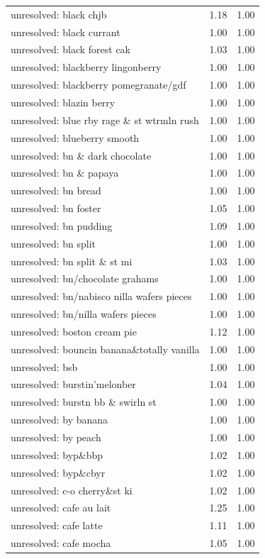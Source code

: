 \begin{table}
\begin{tabular}{lrr}
unresolved: black chjb & 1.18 & 1.00 \\
unresolved: black currant & 1.00 & 1.00 \\
unresolved: black forest cak & 1.03 & 1.00 \\
unresolved: blackberry lingonberry & 1.00 & 1.00 \\
unresolved: blackberry pomegranate/gdf & 1.00 & 1.00 \\
unresolved: blazin berry & 1.00 & 1.00 \\
unresolved: blue rby rage \& st wtrmln rush & 1.00 & 1.00 \\
unresolved: blueberry smooth & 1.00 & 1.00 \\
unresolved: bn \& dark chocolate & 1.00 & 1.00 \\
unresolved: bn \& papaya & 1.00 & 1.00 \\
unresolved: bn bread & 1.00 & 1.00 \\
unresolved: bn foster & 1.05 & 1.00 \\
unresolved: bn pudding & 1.09 & 1.00 \\
unresolved: bn split & 1.00 & 1.00 \\
unresolved: bn split \& st mi & 1.03 & 1.00 \\
unresolved: bn/chocolate grahams & 1.00 & 1.00 \\
unresolved: bn/nabisco nilla wafers pieces & 1.00 & 1.00 \\
unresolved: bn/nilla wafers pieces & 1.00 & 1.00 \\
unresolved: boston cream pie & 1.12 & 1.00 \\
unresolved: bouncin banana\&totally vanilla & 1.00 & 1.00 \\
unresolved: bsb & 1.00 & 1.00 \\
unresolved: burstin'melonber & 1.04 & 1.00 \\
unresolved: burstn bb \& swirln st & 1.00 & 1.00 \\
unresolved: by banana & 1.00 & 1.00 \\
unresolved: by peach & 1.00 & 1.00 \\
unresolved: byp\&bbp & 1.02 & 1.00 \\
unresolved: byp\&cbyr & 1.02 & 1.00 \\
unresolved: c-o cherry\&st ki & 1.02 & 1.00 \\
unresolved: cafe au lait & 1.25 & 1.00 \\
unresolved: cafe latte & 1.11 & 1.00 \\
unresolved: cafe mocha & 1.05 & 1.00 \\

\end{tabular}
\end{table}
